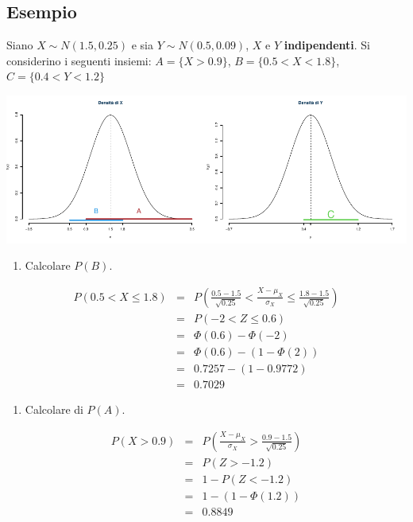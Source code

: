 \documentclass[
  11pt,
]{book}
\providecommand{\tightlist}{%
  \setlength{\itemsep}{0pt}\setlength{\parskip}{0pt}}
\theoremstyle{mytheoremstyle}
\theoremstyle{mydefstyle}
\begin{document}
\clearpage

\subsection{Esempio}\label{esempio-2}

Siano \(X\sim N(1.5,0.25)\) e sia \(Y\sim N(0.5,0.09)\), \(X\) e \(Y\) \textbf{indipendenti}. Si considerino i seguenti insiemi: \(A=\{X>0.9\}\), \(B=\{0.5<X<1.8\}\), \(C=\{0.4<Y< 1.2 \}\)

\begin{center}\includegraphics{Appunti_di_Statistica_2025_files/figure-latex/07d-Esercizi-Normale-14-1} \end{center}

\begin{enumerate}
\def\labelenumi{\arabic{enumi}.}
\tightlist
\item
  Calcolare \(P(B)\).
\end{enumerate}

\begin{eqnarray*}
   P( 0.5 < X \leq  1.8 ) &=& P\left( \frac { 0.5  -  1.5 }{\sqrt{ 0.25 }} < \frac { X  -  \mu_X }{ \sigma_X } \leq \frac { 1.8  -  1.5 }{\sqrt{ 0.25 }}\right)  \\
              &=& P\left(  -2  < Z \leq  0.6 \right) \\
              &=& \Phi( 0.6 )-\Phi( -2 )\\
              &=&  \Phi( 0.6 )-(1-\Phi( 2 )) \\ &=&  0.7257 -(1- 0.9772 ) \\ 
              &=&  0.7029 
   \end{eqnarray*}

\begin{enumerate}
\def\labelenumi{\arabic{enumi}.}
\setcounter{enumi}{1}
\tightlist
\item
  Calcolare di \(P(A)\).
\end{enumerate}

\begin{eqnarray*}
      P( X   >   0.9 ) 
        &=& P\left(  \frac { X  -  \mu_X }{ \sigma_X }  >  \frac { 0.9  -  1.5 }{\sqrt{ 0.25 }} \right)  \\
                 &=& P\left(  Z   >   -1.2 \right) \\    &=& 1-P(Z< -1.2 )\\ 
                 &=&  1-(1-\Phi( 1.2 )) \\ &=&  0.8849 
      \end{eqnarray*}
\end{document}
